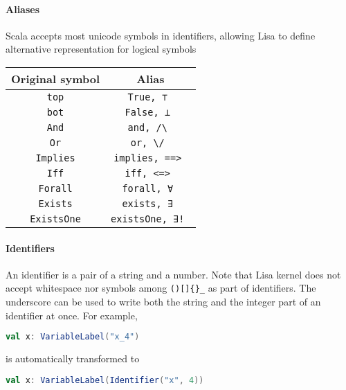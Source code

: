 \paragraph{Aliases}
Scala accepts most unicode symbols in identifiers, allowing Lisa to define alternative representation for logical symbols
\begin{center}
  \begin{tabular}{| c | c |}

    \hline
    Original symbol       & Alias                      \\
    \hline

    \lstinline|top|       & \lstinline|True, ⊤ |       \\ \hline
    \lstinline|bot|       & \lstinline|False, ⊥ |      \\ \hline
    \lstinline|And|       & \lstinline|and, /\ |       \\ \hline
    \lstinline|Or|        & \lstinline|or, \/ |        \\ \hline
    \lstinline|Implies|   & \lstinline|implies, ==> |  \\ \hline
    \lstinline|Iff|       & \lstinline|iff, <=> |      \\ \hline
    \lstinline|Forall|    & \lstinline|forall, ∀ |     \\ \hline
    \lstinline|Exists|    & \lstinline|exists, ∃ |     \\ \hline
    \lstinline|ExistsOne| & \lstinline|existsOne, ∃! | \\ \hline
  \end{tabular}
\end{center}
\paragraph{Identifiers}
An identifier is a pair of a string and a number. Note that Lisa kernel does not accept whitespace nor symbols among \lstinline|()[]{}_| as part of identifiers. The underscore can be used to write both the string and the integer part of an identifier at once. For example,

\begin{lstlisting}[language=Scala]
  val x: VariableLabel("x_4")
\end{lstlisting}

is automatically transformed to

\begin{lstlisting}[language=Scala]
  val x: VariableLabel(Identifier("x", 4))
\end{lstlisting}

